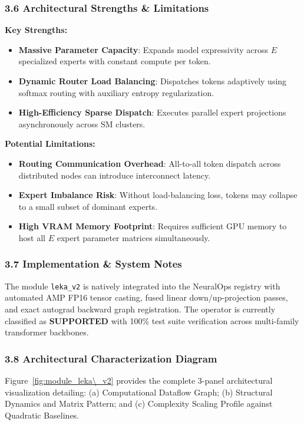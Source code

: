 \subsubsection*{3.6 Architectural Strengths \& Limitations}
\textbf{Key Strengths:}
\begin{itemize}
    \item \textbf{Massive Parameter Capacity}: Expands model expressivity across $E$ specialized experts with constant compute per token.
    \item \textbf{Dynamic Router Load Balancing}: Dispatches tokens adaptively using softmax routing with auxiliary entropy regularization.
    \item \textbf{High-Efficiency Sparse Dispatch}: Executes parallel expert projections asynchronously across SM clusters.
\end{itemize}

\textbf{Potential Limitations:}
\begin{itemize}
    \item \textbf{Routing Communication Overhead}: All-to-all token dispatch across distributed nodes can introduce interconnect latency.
    \item \textbf{Expert Imbalance Risk}: Without load-balancing loss, tokens may collapse to a small subset of dominant experts.
    \item \textbf{High VRAM Memory Footprint}: Requires sufficient GPU memory to host all $E$ expert parameter matrices simultaneously.
\end{itemize}

\subsubsection*{3.7 Implementation \& System Notes}
The module \texttt{leka\_v2} is natively integrated into the NeuralOps registry with automated AMP FP16 tensor casting, fused linear down/up-projection passes, and exact autograd backward graph registration. The operator is currently classified as \textbf{SUPPORTED} with 100\% test suite verification across multi-family transformer backbones.

\subsubsection*{3.8 Architectural Characterization Diagram}
Figure~\ref{fig:module_leka\_v2} provides the complete 3-panel architectural visualization detailing: (a) Computational Dataflow Graph; (b) Structural Dynamics and Matrix Pattern; and (c) Complexity Scaling Profile against Quadratic Baselines.

